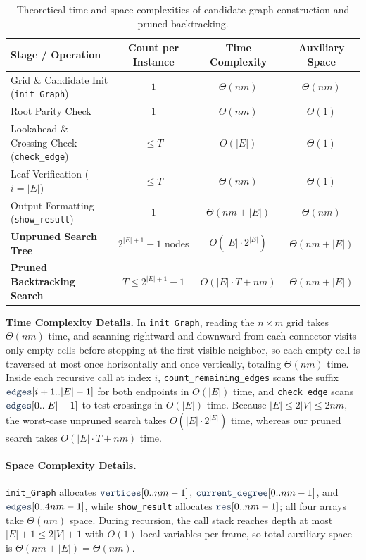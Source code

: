 \documentclass[10pt, a4paper]{article}
\newcommand{\code}[1]{\texttt{\color{primary!90!black}#1}}
\begin{document}
\begin{table}[H]
\centering
\caption{Theoretical time and space complexities of candidate-graph construction and pruned backtracking.}
\label{tab:complexities}
\setlength{\tabcolsep}{4.0pt}
\begin{tabular}{@{}lccc@{}}
\toprule
\textbf{\color{primary}Stage / Operation} & \textbf{\color{primary}Count per Instance} & \textbf{\color{primary}Time Complexity} & \textbf{\color{primary}Auxiliary Space} \\
\midrule
Grid \& Candidate Init (\code{init\_Graph}) & $1$ & $\Theta(nm)$ & $\Theta(nm)$ \\
Root Parity Check & $1$ & $\Theta(nm)$ & $\Theta(1)$ \\
Lookahead \& Crossing Check (\code{check\_edge}) & $\le T$ & $O(|E|)$ & $\Theta(1)$ \\
Leaf Verification ($i = |E|$) & $\le T$ & $\Theta(nm)$ & $\Theta(1)$ \\
Output Formatting (\code{show\_result}) & $1$ & $\Theta(nm + |E|)$ & $\Theta(nm)$ \\
\midrule
\textbf{Unpruned Search Tree} & $2^{|E|+1}-1$ nodes & $O(|E|\cdot 2^{|E|})$ & $\Theta(nm + |E|)$ \\
\textbf{Pruned Backtracking Search} & $T \le 2^{|E|+1}-1$ & $O(|E|\cdot T + nm)$ & $\Theta(nm + |E|)$ \\
\bottomrule
\end{tabular}
\end{table}

\noindent\textbf{Time Complexity Details.} In \code{init\_Graph}, reading the $n \times m$ grid takes $\Theta(nm)$ time, and scanning rightward and downward from each connector visits only empty cells before stopping at the first visible neighbor, so each empty cell is traversed at most once horizontally and once vertically, totaling $\Theta(nm)$ time. Inside each recursive call at index $i$, \code{count\_remaining\_edges} scans the suffix $\code{edges}[i+1..|E|-1]$ for both endpoints in $O(|E|)$ time, and \code{check\_edge} scans $\code{edges}[0..|E|-1]$ to test crossings in $O(|E|)$ time. Because $|E| \le 2|V| \le 2nm$, the worst-case unpruned search takes $O(|E|\cdot 2^{|E|})$ time, whereas our pruned search takes $O(|E|\cdot T + nm)$ time.

\paragraph{Space Complexity Details.}
\code{init\_Graph} allocates $\code{vertices}[0..nm-1]$, $\code{current\_degree}[0..nm-1]$, and $\code{edges}[0..4nm-1]$, while \code{show\_result} allocates $\code{res}[0..nm-1]$; all four arrays take $\Theta(nm)$ space. During recursion, the call stack reaches depth at most $|E| + 1 \le 2|V| + 1$ with $O(1)$ local variables per frame, so total auxiliary space is $\Theta(nm + |E|) = \Theta(nm)$.
\end{document}
